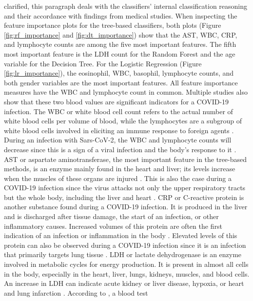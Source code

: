 clarified, this paragraph deals with the classifiers' internal classification 
reasoning and their accordance with findings from medical studies.
When inspecting the feature importance plots for the tree-based classifiers, 
both plots (Figure \ref{fig:rf_importance} and \ref{fig:dt_importance}) show 
that the AST, WBC, CRP, and lymphocyte counts are among the five most important 
features.
The fifth most important feature is the LDH count for the Random Forest and the 
age variable for the Decision Tree. For the Logistic Regression (Figure 
\ref{fig:lr_importance}), the eosinophil, WBC, basophil, lymphocyte counts, and 
both gender variables are the most important features. All feature importance 
measures have the WBC and lymphocyte count in common. Multiple studies also show 
that these two blood values are significant indicators for a COVID-19 infection. 
The WBC or white blood cell count refers to the actual number of white blood 
cells per volume of blood, while the lymphocytes are a subgroup of white blood 
cells 
involved in eliciting an immune response to foreign agents \cite{RN137, RN188}. 
During an infection with Sars-CoV-2, the WBC and lymphocyte counts will 
decrease since this is a sign of a viral infection and the body's response to 
it \cite{RN162,RN186, RN185}.
AST or aspartate aminotransferase, the most important feature in the tree-based 
methods, is an enzyme mainly found in the heart and liver; its levels increase 
when 
the muscles of these organs are injured \cite{RN189, RN188}. This is also the 
case during a COVID-19 infection since the virus attacks not only the upper 
respiratory tracts but the whole body, including the liver and 
heart \cite{RN182}. CRP or C-reactive protein is another substance found during 
a COVID-19 infection. It is produced in the liver and is discharged after 
tissue damage, the start of an infection, or other inflammatory causes. 
Increased volumes of this protein are often the first indication of an 
infection or inflammation in the body \cite{RN138, RN188}. Elevated levels of 
this protein can also be observed during a COVID-19 infection since it is an 
infection that primarily targets lung tissue \cite{RN187, RN162}. LDH or 
lactate 
dehydrogenase is an enzyme involved in metabolic cycles for energy production. 
It is present in almost all cells in the body, especially in the heart, 
liver, lungs, kidneys, muscles, and blood cells. An increase in LDH can 
indicate acute kidney or liver disease, hypoxia, or heart and lung 
infarction \cite{RN190, RN188}. According to \cite{RN162, RN187}, a blood test 
